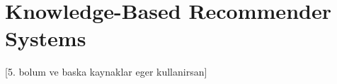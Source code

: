 
\section{Knowledge-Based Recommender Systems}\label{chapter:knowledge_based}

[5. bolum ve baska kaynaklar eger kullanirsan]